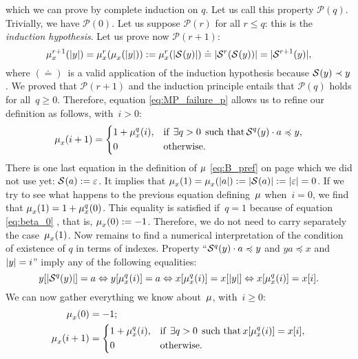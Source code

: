 which we can prove by complete induction on \(q\). Let us call this
property \(\mathcal{P}(q)\). Trivially, we have
\(\mathcal{P}(0)\). Let us suppose \(\mathcal{P}(r)\) for all \(r
\leqslant q\): this is the \emph{induction hypothesis}. Let us prove
now \(\mathcal{P}(r+1)\):
\[
  \mu_{x}^{r+1}(\lvert{y}\lvert{})
= \mu_{x}^{r}(\mu_{x}^{}(\lvert{y}\lvert{})) 
:= \mu_{x}^{r}(\lvert{\mathcal{S}^{}(y)}\lvert{})
\doteq \lvert{\mathcal{S}^{r}(\mathcal{S}^{}(y))}\lvert{}
= \lvert{\mathcal{S}^{r+1}(y)}\lvert{},
\]
where \((\doteq)\)~is a valid application of the induction hypothesis
because \(\mathcal{S}^{}(y) \prec y\). We proved that \(\mathcal{P}(r+1)\)
and the induction principle entails that \(\mathcal{P}(q)\) holds for
all~\({q \geqslant 0}\). Therefore, equation \eqref{eq:MP_failure_p}
allows us to refine our definition as follows, with~\({i>0}\):
\begin{equation*}
\mu_{x}^{}(i+1) =
\left\{
  \begin{aligned}
   & 1 + \mu_{x}^{q}(i),
   && \text{if} \,\; \exists q>0 \,\; \text{such that} \, 
      \mathcal{S}^{q}(y) \cdot a \preccurlyeq y,\\
   & 0
   && \text{otherwise.}
  \end{aligned}
\right.
\end{equation*}
There is one last equation in the definition of \(\mu\)
\eqref{eq:B_pref} on page \pageref{eq:B_pref} which we did not use
yet: \({\mathcal{S}^{}(a) := \varepsilon}\). It implies that
\(\mu_{x}^{}(1) = \mu_{x}^{}(\lvert{a}\lvert{}) := \lvert{\mathcal{S}^{}(a)}\lvert{}
:= \lvert{\varepsilon}\lvert{} = 0\). If we try to see what happens to the
previous equation defining~\(\mu\) when~\({i=0}\), we find
that \(\mu_{x}^{}(1) = 1 + \mu_{x}^{q}(0)\). This equality
is satisfied if~\({q=1}\) because of equation \eqref{eq:beta_0}
, that is, \(\mu_{x}^{}(0) :=
-1\). Therefore, we do not need to carry separately the
case~\(\mu_{x}^{}(1)\). Now remains to find a numerical
interpretation of the condition of existence of \(q\) in terms of
indexes. Property ``\(\mathcal{S}^{q}(y) \cdot a \preccurlyeq y\) and \({ya
  \preccurlyeq x}\) and \({\lvert{y}\lvert{} = i}\)'' imply any of the following
equalities:
\[
y[\lvert{\mathcal{S}^{q}(y)}\lvert{}] = a
\Leftrightarrow
y[\mu_{x}^{q}(i)] = a
\Leftrightarrow
x[\mu_{x}^{q}(i)] = x[\lvert{y}\lvert{}]
\Leftrightarrow
x[\mu_{x}^{q}(i)] = x[i].
\]
We can now gather everything we know about~\(\mu\),
with~\({i \geqslant 0}\):
\[
\begin{aligned}
 \mu_{x}^{}(0)   &= -1;\\
 \mu_{x}^{}(i+1) &=
   \left\{
     \begin{aligned}
       & 1 + \mu_{x}^{q}(i),
       && \text{if} \,\; \exists q>0 \,\; \text{such that} \, 
          x[\mu_{x}^{q}(i)] = x[i],\\
       & 0
       && \text{otherwise.}
     \end{aligned}
   \right.
\end{aligned}
\]
